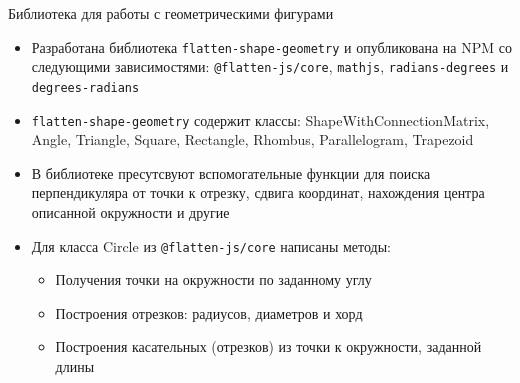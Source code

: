 \documentclass[aspectratio=169,12pt]{beamer}
\begin{document}
\begin{frame}{Библиотека для работы с геометрическими фигурами}
	\begin{itemize}
		\item Разработана библиотека \texttt{flatten-shape-geometry} и опубликована на NPM со следующими зависимостями:
		      \texttt{@flatten-js/core}, \texttt{mathjs}, \texttt{radians-degrees} и \texttt{degrees-radians}
		\item \texttt{flatten-shape-geometry} содержит классы: ShapeWithConnectionMatrix, Angle,  Triangle, Square, Rectangle, Rhombus, Parallelogram, Trapezoid
		\item В библиотеке пресутсвуют вспомогательные функции для поиска перпендикуляра от точки к отрезку, сдвига координат, нахождения центра описанной окружности и другие
		\item Для класса Circle из \texttt{@flatten-js/core} написаны методы:
		      \begin{itemize}
			      \item Получения точки на окружности по заданному углу
			      \item Построения отрезков: радиусов, диаметров и хорд
			      \item Построения касательных (отрезков) из точки к окружности, заданной длины
		      \end{itemize}
	\end{itemize}
\end{frame}
\end{document}
